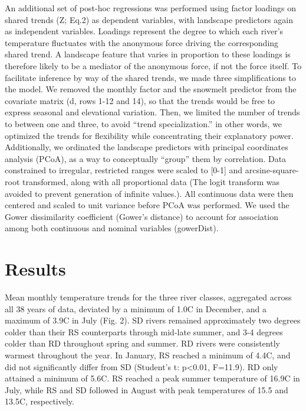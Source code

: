 An additional set of post-hoc regressions was performed using factor loadings on shared trends (Z; Eq.2) as dependent variables, with landscape predictors again as independent variables. Loadings represent the degree to which each river's temperature fluctuates with the anonymous force driving the corresponding shared trend. A landscape feature that varies in proportion to these loadings is therefore likely to be a mediator of the anonymous force, if not the force itself. To facilitate inference by way of the shared trends, we made three simplifications to the model. We removed the monthly factor and the snowmelt predictor from the covariate matrix (d, rows 1-12 and 14), so that the trends would be free to express seasonal and elevational variation. Then, we limited the number of trends to between one and three, to avoid ``trend specialization.'' in other words, we optimized the trends for flexibility while concentrating their explanatory power. Additionally, we ordinated the landscape predictors with principal coordinates analysis (PCoA), as a way to conceptually ``group'' them by correlation. Data constrained to irregular, restricted ranges were scaled to [0-1] and arcsine-square-root transformed, along with all proportional data (The logit transform was avoided to prevent generation of infinite values.). All continuous data were then centered and scaled to unit variance before PCoA was performed. We used the Gower dissimilarity coefficient (Gower's distance) to account for association among both continuous and nominal variables (gowerDist).

\section*{Results}

Mean monthly temperature trends for the three river classes, aggregated across all 38 years of data, deviated by a minimum of 1.0\degree C in December, and a maximum of 3.9\degree C in July (Fig. 2). SD rivers remained approximately two degrees colder than their RS counterparts through mid-late summer, and 3-4 degrees colder than RD throughout spring and summer. RD rivers were consistently warmest throughout the year. In January, RS reached a minimum of 4.4\degree C, and did not significantly differ from SD (Student's t: p<0.01, F=11.9). RD only attained a minimum of 5.6\degree C. RS reached a peak summer temperature of 16.9\degree C in July, while RS and SD followed in August with peak temperatures of 15.5 and 13.5\degree C, respectively.

